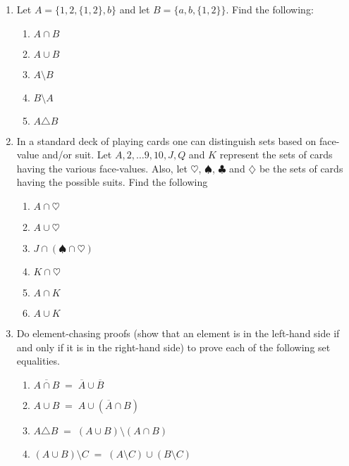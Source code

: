 \begin{enumerate}
\item Let $A = \{1,2,\{1,2\},b\}$ and let $B=\{a, b, \{1,2\} \}$.
Find the following:
  \begin{enumerate}
  \item $A \cap B$
  \item $A \cup B$
  \item $A \setminus B$
  \item $B \setminus A$
  \item $A \triangle B$
  \end{enumerate}

\item In a standard deck of playing cards one can distinguish sets
based on face-value and/or suit.  Let $A, 2, \ldots 9, 10, J, Q$ and $K$
represent the sets of cards having the various face-values.  Also, let
$\heartsuit$, $\spadesuit$, $\clubsuit$ and $\diamondsuit$ be the 
sets of cards having the possible suits.  Find the following
  \begin{enumerate}
  \item $A \cap \heartsuit$
  \item $A \cup \heartsuit$
  \item $J \cap (\spadesuit \cap \heartsuit)$ %
  \item $K \cap \heartsuit$ %
  \item $A \cap K$
  \item $A \cup K$
  \end{enumerate}

\item Do element-chasing proofs (show that an element is in the left-hand side if and only if it is in the right-hand side) to prove each of the following set equalities.  

  \begin{enumerate}
  \item $\overline{A\cap B} \; = \; \overline{A}\cup\overline{B}$

  \item $A\cup B \; = \; A\cup(\overline{A}\cap B)$

  \item $A\triangle B \; = \; (A\cup B)\setminus(A\cap B)$

  \item $(A\cup B)\setminus C \; = \; (A\setminus C)\cup(B\setminus C)$

  \end{enumerate}


\end{enumerate}
